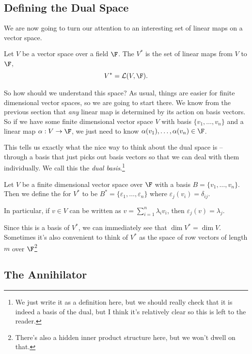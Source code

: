 \documentclass[a4paper]{scrartcl}
\begin{document}
\subsection{Defining the Dual Space}

We are now going to turn our attention to an interesting set of linear maps on a vector space.

\begin{definition}
    Let $V$ be a vector space over a field $\F$. The  $V^*$ is the set of linear maps from $V$ to $\F$,
    $$
    V^* = \mathcal{L}(V, \F).
    $$
\end{definition}

So how should we understand this space?
As usual, things are easier for finite dimensional vector spaces, so we are going to start there. We know from the previous section that \emph{any} linear map is determined by its action on basis vectors. So if we have some finite dimensional vector space $V$ with basis $\{v_1, \dots, v_n\}$ and a linear map $\alpha: V \rightarrow \F$, we just need to know $\alpha(v_1), \dots, \alpha(v_n) \in \F$.

This tells us exactly what the nice way to think about the dual space is -- through a basis that just picks out basis vectors so that we can deal with them individually. We call this the \emph{dual basis}.\footnote{We just write it as a definition here, but we should really check that it is indeed a basis of the dual, but I think it's relatively clear so this is left to the reader.}

\begin{definition}
    Let $V$ be a finite dimensional vector space over $\F$ with a basis $B = \{v_1, \dots, v_n\}$. 
    Then we define the  for $V^*$ to be $B^* = \{\varepsilon_1, \dots, \varepsilon_n\}$ where $\varepsilon_j(v_i) = \delta_{ij}$.

    In particular, if $v \in V$ can be written as $v = \sum_{i = 1}^n \lambda_i v_i$, then $\varepsilon_j(v) = \lambda_j$.
\end{definition}

Since this is a basis of $V^*$, we can immediately see that $\dim V^* = \dim V$. Sometimes it's also convenient to think of $V^*$ as the space of row vectors of length $m$ over $\F$\footnote{There's also a hidden inner product structure here, but we won't dwell on that.}

\subsection{The Annihilator}
\end{document}
